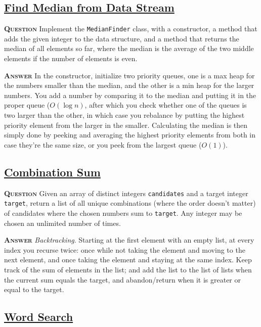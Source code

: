 \documentclass[table, xcdraw]{article}%
\begin{document}
\subsection{\href{https://leetcode.com/problems/find-median-from-data-stream}{Find Median from Data Stream}}

\textsc{\textbf{Question}} Implement the \texttt{MedianFinder} class, with a constructor, a method that adds the given integer to the data structure, and a method that returns the median of all elements so far, where the median is the average of the two middle elements if the number of elements is even.

\textsc{\textbf{Answer}} In the constructor, initialize two priority queues, one is a max heap for the numbers smaller than the median, and the other is a min heap for the larger numbers. You add a number by comparing it to the median and putting it in the proper queue ($O(\log n)$, after which you check whether one of the queues is two larger than the other, in which case you rebalance by putting the highest priority element from the larger in the smaller. Calculating the median is then simply done by peeking and averaging the highest priority elements from both in case they're the same size, or you peek from the largest queue ($O(1)$).

\subsection{\href{https://leetcode.com/problems/combination-sum}{Combination Sum}}

\textsc{\textbf{Question}} Given an array of distinct integers \texttt{candidates} and a target integer \texttt{target}, return a list of all unique combinations (where the order doesn't matter) of candidates where the chosen numbers sum to \texttt{target}. Any integer may be chosen an unlimited number of times.

\textsc{\textbf{Answer}} \textit{Backtracking}. Starting at the first element with an empty list, at every index you recurse twice: once while not taking the element and moving to the next element, and once taking the element and staying at the same index. Keep track of the sum of elements in the list; and add the list to the list of lists when the current sum equals the target, and abandon/return when it is greater or equal to the target.

\subsection{\href{https://leetcode.com/problems/word-search}{Word Search}}
\end{document}
